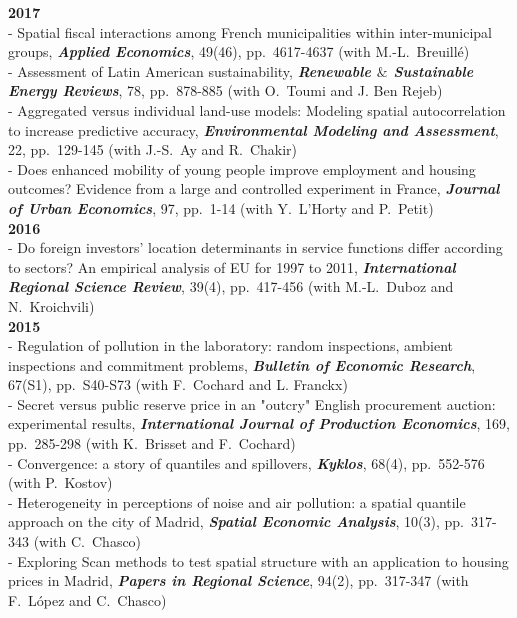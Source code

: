 \documentclass[a4paper,12pt]{article}
\begin{document}
\noindent \textbf{2017}  \smallskip \\ 
- Spatial fiscal interactions among French municipalities within inter-municipal groups, \textit{\textbf{Applied Economics}}, 49(46), pp.~4617-4637 (with M.-L.~Breuillé) \\
- Assessment of Latin American sustainability, \textit{\textbf{Renewable $\&$ Sustainable Energy Reviews}}, 78, pp.~878-885 (with O.~Toumi and J. Ben Rejeb) \\
- Aggregated versus individual land-use models: Modeling spatial autocorrelation to increase predictive accuracy, \textit{\textbf{Environmental Modeling and Assessment}}, 22, pp.~129-145 (with J.-S.~Ay and R.~Chakir) \\
- Does enhanced mobility of young people improve employment and housing outcomes? Evidence from a large and controlled experiment in France, \textit{\textbf{Journal of Urban Economics}}, 97, pp.~1-14 (with Y.~L'Horty and P.~Petit) \\
		
\noindent \textbf{2016}  \smallskip \\ 
- Do foreign investors' location determinants in service functions differ according to sectors? An empirical analysis of EU for 1997 to 2011, \textit{\textbf{International Regional Science Review}}, 39(4), pp.~417-456 (with M.-L.~Duboz and N.~Kroichvili) \\

\noindent \textbf{2015}  \smallskip \\ 
- Regulation of pollution in the laboratory: random inspections, ambient inspections and commitment problems, \textit{\textbf{Bulletin of Economic Research}}, 67(S1), pp.~S40-S73 (with F.~Cochard and L. Franckx) \\
- Secret versus public reserve price in an "outcry" English procurement auction: experimental results, \textit{\textbf{International Journal of Production Economics}}, 169, pp.~285-298 (with K.~Brisset and F.~Cochard)\\
- Convergence: a story of quantiles and spillovers, \textit{\textbf{Kyklos}}, 68(4), pp.~552-576 (with P.~Kostov)\\
- Heterogeneity in perceptions of noise and air pollution: a spatial quantile approach on the city of Madrid, \textit{\textbf{Spatial Economic Analysis}}, 10(3), pp.~317-343 (with C.~Chasco)\\
- Exploring Scan methods to test spatial structure with an application to housing prices in Madrid, \textit{\textbf{Papers in Regional Science}}, 94(2), pp.~317-347 (with F.~López and C.~Chasco) \\
\end{document}
